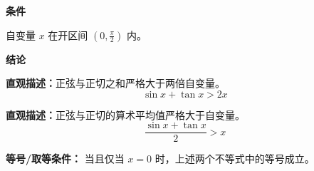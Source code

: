 \begin{statementbox}

\textbf{\textcolor{CStatement}{条件}}
\begin{description}[style=nextline, leftmargin=2.8em, labelsep=0.5em, itemsep=0.35em]
    \item[\textbf{\textcolor{CStatement}{条件 1（自变量范围）：}}] 自变量 $x$ 在开区间 $(0, \frac{\pi}{2})$ 内。
\end{description}

\textbf{\textcolor{CStatement}{结论}}
\begin{description}[style=nextline, leftmargin=2.8em, labelsep=0.5em, itemsep=0.45em]
    \item[\textbf{\textcolor{CStatement}{结论一（和式放缩）：}}]
    \textbf{\textcolor{CStatement}{直观描述：}}正弦与正切之和严格大于两倍自变量。
    \[
    \sin x + \tan x > 2x
    \]

    \item[\textbf{\textcolor{CStatement}{推广结论（均值放缩）：}}]
    \textbf{\textcolor{CStatement}{直观描述：}}正弦与正切的算术平均值严格大于自变量。
    \[
    \frac{\sin x + \tan x}{2} > x
    \]
\end{description}

\textbf{\textcolor{CStatement}{等号/取等条件：}} 当且仅当 $x=0$ 时，上述两个不等式中的等号成立。
\end{statementbox}
